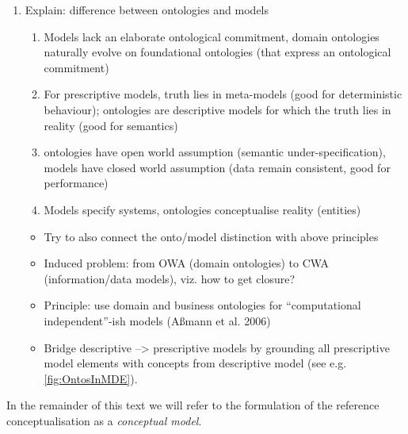 \documentclass[a4paper,11pt,oneside,oldfontcommands]{memoir}
\theoremstyle{definition}
\theoremstyle{break}		%
\numberwithin{equation}{chapter}
\numberwithin{figure}{chapter}
\begin{document}
\begin{enumerate}
\def\labelenumi{\arabic{enumi}.}
\tightlist
\item
  Explain: difference between ontologies and models

  \begin{enumerate}
  \def\labelenumii{\roman{enumii}.}
  \tightlist
  \item
    Models lack an elaborate ontological commitment, domain ontologies
    naturally evolve on foundational ontologies (that express an
    ontological commitment)
  \item
    For prescriptive models, truth lies in meta-models (good for
    deterministic behaviour); ontologies are descriptive models for
    which the truth lies in reality (good for semantics)
  \item
    ontologies have open world assumption (semantic
    under-specification), models have closed world assumption (data
    remain consistent, good for performance)
  \item
    Models specify systems, ontologies conceptualise reality (entities)
  \end{enumerate}

  \begin{itemize}
  \tightlist
  \item
    Try to also connect the onto/model distinction with above principles
  \item
    Induced problem: from OWA (domain ontologies) to CWA
    (information/data models), viz. how to get closure?
  \item
    Principle: use domain and business ontologies for ``computational
    independent''-ish models (Aßmann et al. 2006)
  \item
    Bridge descriptive --\textgreater{} prescriptive models by grounding
    all prescriptive model elements with concepts from descriptive model
    (see e.g. \cref{fig:OntosInMDE}).
  \end{itemize}
\end{enumerate}

In the remainder of this text we will refer to the formulation of the
reference conceptualisation as a \emph{conceptual model}.
\end{document}
